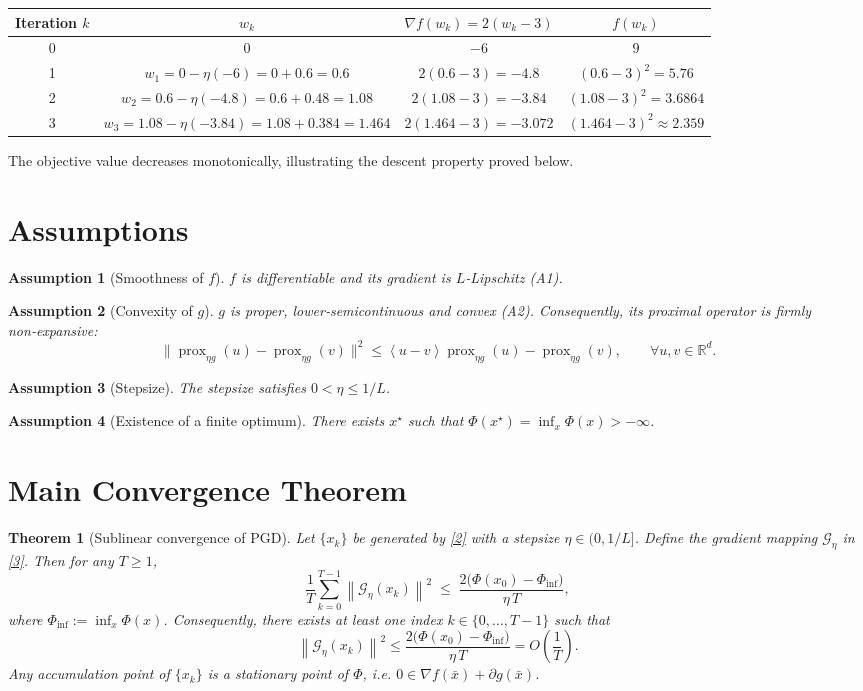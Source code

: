 \documentclass{article}
\newtheorem{theorem}{Theorem}
\newtheorem{assumption}{Assumption}
\newcommand{\prox}{\operatorname{prox}}
\newcommand{\R}{\mathbb{R}}
\newcommand{\norm}[1]{\left\|#1\right\|}
\newcommand{\inner}[1]{\left\langle#1\right\rangle}
\newcommand{\grad}{\nabla}
\newcommand{\G}{\mathcal{G}}
\begin{document}
\begin{center}
\begin{tabular}{c|c|c|c}
Iteration $k$ & $w_{k}$ & $\grad f(w_{k})=2(w_{k}-3)$ & $f(w_{k})$\\\hline
0 & $0$ & $-6$ & $9$\\
1 & $w_{1}=0-\eta(-6)=0+0.6=0.6$ & $2(0.6-3)=-4.8$ & $(0.6-3)^{2}=5.76$\\
2 & $w_{2}=0.6-\eta(-4.8)=0.6+0.48=1.08$ & $2(1.08-3)=-3.84$ & $(1.08-3)^{2}=3.6864$\\
3 & $w_{3}=1.08-\eta(-3.84)=1.08+0.384=1.464$ & $2(1.464-3)=-3.072$ & $(1.464-3)^{2}\approx2.359$\\
\end{tabular}
\end{center}
The objective value decreases monotonically, illustrating the descent property proved below.

\newpage
\section*{Assumptions}
\begin{assumption}[Smoothness of $f$]\label{ass:smooth}
$f$ is differentiable and its gradient is $L$‑Lipschitz (A1).
\end{assumption}
\begin{assumption}[Convexity of $g$]\label{ass:convex}
$g$ is proper, lower‑semicontinuous and convex (A2). Consequently, its proximal operator is \emph{firmly non‑expansive}:
\[
\|\prox_{\eta g}(u)-\prox_{\eta g}(v)\|^{2}
\le \inner{u-v}{\prox_{\eta g}(u)-\prox_{\eta g}(v)},
\qquad\forall u,v\in\R^{d}.
\tag{4}
\]
\end{assumption}
\begin{assumption}[Stepsize]\label{ass:stepsize}
The stepsize satisfies $0<\eta\le 1/L$.
\end{assumption}
\begin{assumption}[Existence of a finite optimum]\label{ass:bound}
There exists $x^{\star}$ such that $\Phi(x^{\star})=\inf_{x}\Phi(x)>-\infty$.
\end{assumption}

\section*{Main Convergence Theorem}
\begin{theorem}[Sublinear convergence of PGD]\label{thm:main}
Let $\{x_{k}\}$ be generated by \eqref{2} with a stepsize $\eta\in(0,1/L]$.
Define the gradient mapping $\G_{\eta}$ in \eqref{3}.
Then for any $T\ge1$,
\[
\frac{1}{T}\sum_{k=0}^{T-1}\norm{\G_{\eta}(x_{k})}^{2}
\;\le\;
\frac{2\big(\Phi(x_{0})-\Phi_{\inf}\big)}{\eta\,T},
\tag{5}
\]
where $\Phi_{\inf}:=\inf_{x}\Phi(x)$.
Consequently, there exists at least one index $k\in\{0,\dots,T-1\}$ such that
\[
\norm{\G_{\eta}(x_{k})}^{2}\le \frac{2\big(\Phi(x_{0})-\Phi_{\inf}\big)}{\eta\,T}=O\!\left(\frac{1}{T}\right).
\tag{6}
\]
Any accumulation point of $\{x_{k}\}$ is a stationary point of $\Phi$, i.e.
$0\in\grad f(\bar x)+\partial g(\bar x)$.
\end{theorem}
\end{document}
